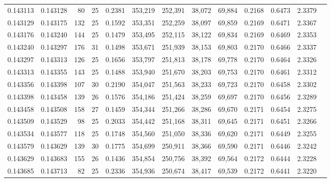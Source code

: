 \begin{tabular}{rrrrrrrrrrrrr}
0.143113 & 0.143128 &  80 &  25 &                                     0.2381 & 353,219 & 252,391 &  38,072 &  69,884 & 0.2168 & 0.6473 & 2.3379 \\
0.143129 & 0.143175 & 132 &  25 &                                     0.1592 & 353,351 & 252,259 &  38,097 &  69,859 & 0.2169 & 0.6471 & 2.3367 \\
0.143176 & 0.143240 & 144 &  25 &                                     0.1479 & 353,495 & 252,115 &  38,122 &  69,834 & 0.2169 & 0.6469 & 2.3353 \\
0.143240 & 0.143297 & 176 &  31 &                                     0.1498 & 353,671 & 251,939 &  38,153 &  69,803 & 0.2170 & 0.6466 & 2.3337 \\
0.143297 & 0.143313 & 126 &  25 &                                     0.1656 & 353,797 & 251,813 &  38,178 &  69,778 & 0.2170 & 0.6464 & 2.3326 \\
0.143313 & 0.143355 & 143 &  25 &                                     0.1488 & 353,940 & 251,670 &  38,203 &  69,753 & 0.2170 & 0.6461 & 2.3312 \\
0.143356 & 0.143398 & 107 &  30 &                                     0.2190 & 354,047 & 251,563 &  38,233 &  69,723 & 0.2170 & 0.6458 & 2.3302 \\
0.143398 & 0.143458 & 139 &  26 &                                     0.1576 & 354,186 & 251,424 &  38,259 &  69,697 & 0.2170 & 0.6456 & 2.3289 \\
0.143458 & 0.143508 & 158 &  27 &                                     0.1459 & 354,344 & 251,266 &  38,286 &  69,670 & 0.2171 & 0.6454 & 2.3275 \\
0.143509 & 0.143529 &  98 &  25 &                                     0.2033 & 354,442 & 251,168 &  38,311 &  69,645 & 0.2171 & 0.6451 & 2.3266 \\
0.143534 & 0.143577 & 118 &  25 &                                     0.1748 & 354,560 & 251,050 &  38,336 &  69,620 & 0.2171 & 0.6449 & 2.3255 \\
0.143579 & 0.143629 & 139 &  30 &                                     0.1775 & 354,699 & 250,911 &  38,366 &  69,590 & 0.2171 & 0.6446 & 2.3242 \\
0.143629 & 0.143683 & 155 &  26 &                                     0.1436 & 354,854 & 250,756 &  38,392 &  69,564 & 0.2172 & 0.6444 & 2.3228 \\
0.143685 & 0.143713 &  82 &  25 &                                     0.2336 & 354,936 & 250,674 &  38,417 &  69,539 & 0.2172 & 0.6441 & 2.3220 \\

\end{tabular}
